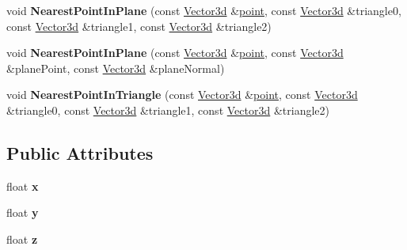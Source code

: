 \begin{DoxyCompactItemize}
\item 
\hypertarget{class_convex_decomposition_1_1_vector3d_afa5bf7a4b38b4d99631f7f1f4cc30884}{void {\bfseries Nearest\+Point\+In\+Plane} (const \hyperlink{class_convex_decomposition_1_1_vector3d}{Vector3d} \&\hyperlink{structpoint}{point}, const \hyperlink{class_convex_decomposition_1_1_vector3d}{Vector3d} \&triangle0, const \hyperlink{class_convex_decomposition_1_1_vector3d}{Vector3d} \&triangle1, const \hyperlink{class_convex_decomposition_1_1_vector3d}{Vector3d} \&triangle2)}\label{class_convex_decomposition_1_1_vector3d_afa5bf7a4b38b4d99631f7f1f4cc30884}

\item 
\hypertarget{class_convex_decomposition_1_1_vector3d_adec7dc1dab1ef322f7cce7f0409eef1c}{void {\bfseries Nearest\+Point\+In\+Plane} (const \hyperlink{class_convex_decomposition_1_1_vector3d}{Vector3d} \&\hyperlink{structpoint}{point}, const \hyperlink{class_convex_decomposition_1_1_vector3d}{Vector3d} \&plane\+Point, const \hyperlink{class_convex_decomposition_1_1_vector3d}{Vector3d} \&plane\+Normal)}\label{class_convex_decomposition_1_1_vector3d_adec7dc1dab1ef322f7cce7f0409eef1c}

\item 
\hypertarget{class_convex_decomposition_1_1_vector3d_a4c4cd711a36775e0dffdcd48f4339f3e}{void {\bfseries Nearest\+Point\+In\+Triangle} (const \hyperlink{class_convex_decomposition_1_1_vector3d}{Vector3d} \&\hyperlink{structpoint}{point}, const \hyperlink{class_convex_decomposition_1_1_vector3d}{Vector3d} \&triangle0, const \hyperlink{class_convex_decomposition_1_1_vector3d}{Vector3d} \&triangle1, const \hyperlink{class_convex_decomposition_1_1_vector3d}{Vector3d} \&triangle2)}\label{class_convex_decomposition_1_1_vector3d_a4c4cd711a36775e0dffdcd48f4339f3e}

\end{DoxyCompactItemize}
\subsection*{Public Attributes}
\begin{DoxyCompactItemize}
\item 
\hypertarget{class_convex_decomposition_1_1_vector3d_acfb132b502e04f569ed13a36cfd40624}{float {\bfseries x}}\label{class_convex_decomposition_1_1_vector3d_acfb132b502e04f569ed13a36cfd40624}

\item 
\hypertarget{class_convex_decomposition_1_1_vector3d_ad8eea277792f8fdd484676c8d896adc4}{float {\bfseries y}}\label{class_convex_decomposition_1_1_vector3d_ad8eea277792f8fdd484676c8d896adc4}

\item 
\hypertarget{class_convex_decomposition_1_1_vector3d_a735974e9f880035371e92ec46070b5bc}{float {\bfseries z}}\label{class_convex_decomposition_1_1_vector3d_a735974e9f880035371e92ec46070b5bc}

\end{DoxyCompactItemize}


